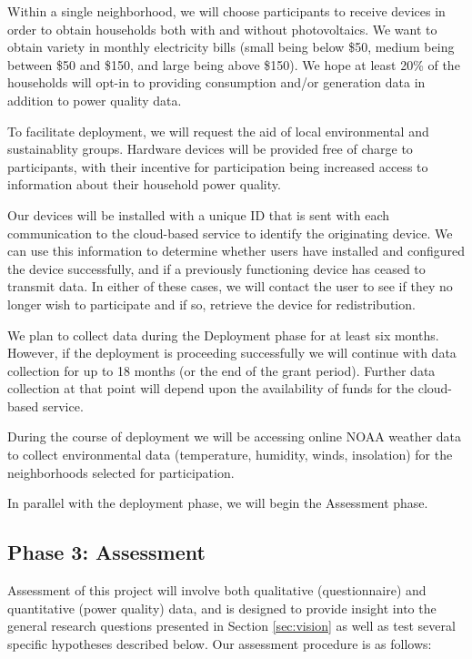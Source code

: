 Within a single neighborhood, we will choose participants to receive devices in order to obtain households both with and without photovoltaics. We want to obtain variety in monthly electricity bills (small being below \$50, medium being between \$50 and \$150, and large being above \$150).  We hope at least 20\% of the households will opt-in to providing consumption and/or generation data in addition to power quality data. 

To facilitate deployment, we will request the aid of local environmental and sustainablity groups.  Hardware devices will be provided free of charge to participants, with their incentive for participation being increased access to information about their household power quality.  

Our devices will be installed with a unique ID that is sent with each communication to the cloud-based service to identify the originating device.  We can use this information to determine whether users have installed and configured the device successfully, and if a previously functioning device has ceased to transmit data.   In either of these cases, we will contact the user to see if they no longer wish to participate and if so, retrieve the device for redistribution. 

We plan to collect data during the Deployment phase for at least six months. However, if the deployment is proceeding successfully we will continue with data collection for up to 18 months (or the end of the grant period).  Further data collection at that point will depend upon the availability of funds for the cloud-based service.

During the course of deployment we will be accessing online NOAA weather data to collect environmental data (temperature, humidity, winds, insolation) for the neighborhoods selected for participation. 

In parallel with the deployment phase, we will begin the Assessment phase. 

\subsection{Phase 3: Assessment}

Assessment of this project will involve both qualitative (questionnaire) and quantitative (power quality) data, and is designed to provide insight into the general research questions presented in Section \ref{sec:vision} as well as test several specific hypotheses described below. Our assessment procedure is as follows:

